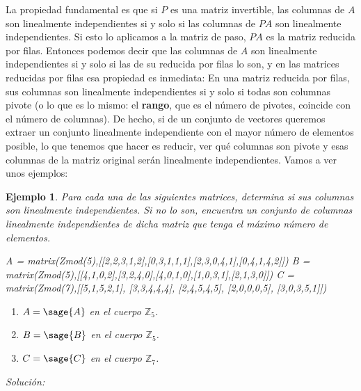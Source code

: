 \documentclass{amsart}
\newtheorem{ejem}{Ejemplo}
\begin{document}
La propiedad fundamental es que si $P$ es una matriz invertible, las 
columnas de $A$ son linealmente independientes si y solo si las columnas
de $PA$ son linealmente independientes. Si esto lo aplicamos a la matriz de
paso, $PA$ es la matriz reducida por filas. Entonces podemos decir que las
columnas de $A$ son linealmente independientes si y solo si las de su reducida
por filas lo son, y en las matrices reducidas por filas esa propiedad
es inmediata: En una matriz reducida por filas, sus columnas son
linealmente independientes si y solo si todas son columnas pivote (o lo que
es lo mismo: el {\bf rango}, que es el número de pivotes, coincide con el 
número de columnas). De hecho,
si de un conjunto de vectores queremos extraer un conjunto linealmente 
independiente con el mayor número de elementos posible, lo que tenemos que
hacer es reducir, ver qué columnas son pivote y esas columnas de la matriz
original serán linealmente independientes. Vamos a ver unos ejemplos:

\begin{ejem}
Para cada una de las siguientes matrices, determina si sus columnas son 
linealmente independientes. Si no lo son, encuentra un conjunto de columnas
linealmente independientes de dicha matriz que tenga el máximo número de 
elementos.

\begin{sagecode}
A = matrix(Zmod(5),[[2,2,3,1,2],[0,3,1,1,1],[2,3,0,4,1],[0,4,1,4,2]])
B = matrix(Zmod(5),[[4,1,0,2],[3,2,4,0],[4,0,1,0],[1,0,3,1],[2,1,3,0]])
C = matrix(Zmod(7),[[5,1,5,2,1],
[3,3,4,4,4],
[2,4,5,4,5],
[2,0,0,0,5],
[3,0,3,5,1]])
\end{sagecode}

\begin{enumerate}
\item $A = \sage{A}$ en el cuerpo ${\mathbb Z}_5$.
\item $B = \sage{B}$ en el cuerpo ${\mathbb Z}_5$.
\item $C = \sage{C}$ en el cuerpo ${\mathbb Z}_7$.
\end{enumerate}
\end{ejem}

{\it Solución:}
\end{document}
